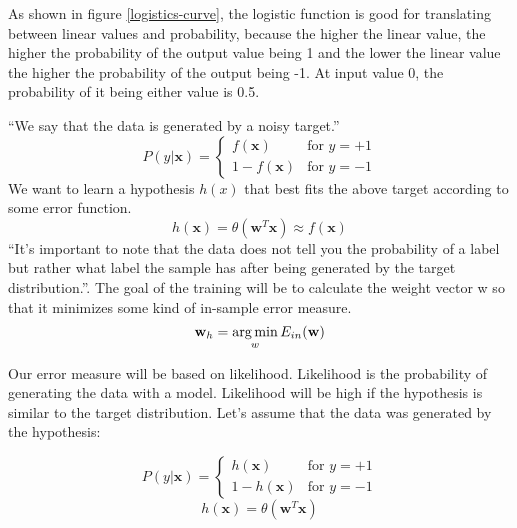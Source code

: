 As shown in figure \ref{logistics-curve}, the logistic function is good for
translating between linear values and probability, because the higher the linear value, the higher the probability of the output value being 1 and the lower the linear value the higher the probability of the output being -1. At input value 0, the probability of it being either value is 0.5.

``We say that the data is generated by a noisy
target.''\cite{website:logistic-regression} \[ P(y|\mathbf{x}) = \left\{
\begin{array}{ll}
f(\mathbf{x}) & \mbox{for } y = +1 \\
1 - f(\mathbf{x}) & \mbox{for } y = -1
\end{array} \right. \]
We want to learn a hypothesis $h(x)$ that best fits the above target according to some error function.
\[h(\mathbf{x}) = \theta \left( \mathbf{w}^T \mathbf{x} \right)\approx f(\mathbf{x})\]
``It's important to note that the data does not tell you the probability of a
label but rather what label the sample has after being generated by the target
distribution.''\cite{website:logistic-regression}. The goal of the training will be to calculate the weight vector w so that it minimizes some kind of in-sample error measure.
\[\mathbf{w}_h = \operatorname*{arg\,min}_w E_{in} (\mathbf{w})\]

Our error measure will be based on likelihood. Likelihood is the probability of
generating the data with a model. Likelihood will be high if the hypothesis is
similar to the target distribution. Let's assume that the data was generated by
the hypothesis:

\[P(y|\mathbf{x}) = \left\{ 
\begin{array}{ll}
h(\mathbf{x}) & \mbox{for } y = + 1 \\
1 - h(\mathbf{x}) & \mbox{for } y = -1
\end{array}
\right.\]
\[h(\mathbf{x}) = \theta (\mathbf{w}^T \mathbf{x})\]

